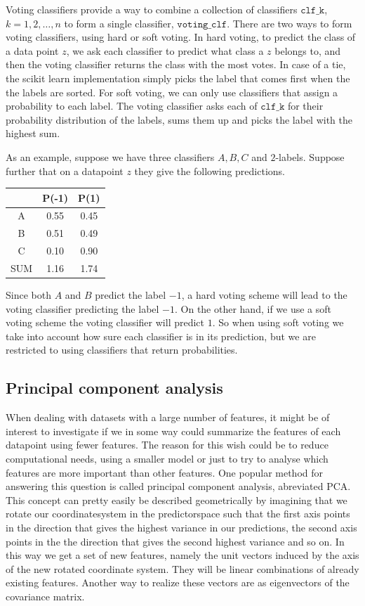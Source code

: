 \documentclass[parskip=half]{scrartcl}
\theoremstyle{definition}
\theoremstyle{remark}
\newcommand{\varname}[1]{\texttt{#1}}
\begin{document}
Voting classifiers provide a way to combine a collection of classifiers $\varname{clf\_k}$, $k=1,2,\ldots,n$ to form a single classifier, $\varname{voting\_clf}$. 
There are two ways to form voting classifiers, using hard or soft voting. 
In hard voting, to predict the class of a data point $z$, we ask each classifier to predict what class a $z$ belongs to, and then the voting classifier returns the class with the most votes. 
In case of a tie, the scikit learn implementation simply picks the label that comes first when the the labels are sorted. 
For soft voting, we can only use classifiers that assign a probability to each label. 
The voting classifier asks each of $\varname{clf\_k}$ for their probability distribution of the labels, sums them up and picks the label with the highest sum. 

As an example, suppose we have three classifiers $A,B,C$ and $2$-labels. 
Suppose further that on a datapoint $z$ they give the following predictions.

\begin{center}
\begin{tabular}{c|cc}
 & P(-1) & P(1) \\ 
\hline
\hline 
A & 0.55 & 0.45 \\ 
B & 0.51 & 0.49 \\ 
C & 0.10 & 0.90 \\ 
SUM & 1.16 & 1.74
\end{tabular} 
\end{center}

Since both $A$ and $B$ predict the label $-1$, a hard voting scheme will lead to the voting classifier predicting the label $-1$.
On the other hand, if we use a soft voting scheme the voting classifier will predict $1$.
So when using soft voting  we take into account how sure each classifier is in its prediction, but we are restricted to using classifiers that return probabilities.  

\subsection{Principal component analysis}

When dealing with datasets with a large number of features, it might be of interest to investigate if we in some way could summarize the features of each datapoint using fewer features.
The reason for this wish could be to reduce computational needs, using a smaller model or just to try to analyse which features are more important than other features. 
One popular method for answering this question is called principal component analysis, abreviated PCA. This concept can pretty easily be described geometrically by imagining that we rotate our coordinatesystem in the predictorspace such that the first axis points in the direction that gives the highest variance in our predictions, the second axis points in the the direction that gives the second highest variance and so on. 
In this way we get a set of new features, namely the unit vectors induced by the axis of the new rotated coordinate system. 
They will be linear combinations of already existing features. 
Another way to realize these vectors are as eigenvectors of the covariance matrix. 
\end{document}
